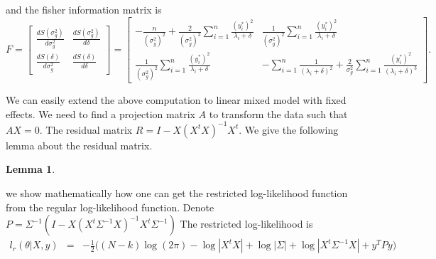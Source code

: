 \documentclass[12pt]{article}
\newtheorem{lemma}[theorem]{Lemma}
\numberwithin{equation}{section}
\begin{document}
and the fisher information matrix is
\[
F=\begin{bmatrix}
\frac{dS(\sigma_g^2)}{d \sigma_g^2} & \frac{dS(\sigma_g^2)}{d \delta} \\ \frac{dS(\delta)}{d \sigma_g^2 } &\frac{dS(\delta)}{d \delta} 
\end{bmatrix} =
\begin{bmatrix}
-\frac{n}{(\sigma_g^2)^2}+\frac{2}{(\sigma_g^2)^3} \sum_{i=1}^n \frac{(y_i^*)^2}{\lambda_i+\delta} & \frac{1}{(\sigma_g^2)^2} \sum_{i=1}^n \frac{(y_i^*)^2}{\lambda_i+\delta}  \\
\frac{1}{(\sigma_g^2)^2} \sum_{i=1}^n \frac{(y_i^*)^2}{\lambda_i+\delta}  & -\sum_{i=1}^n \frac{1}{(\lambda_i+\delta)^2}+\frac{2}{\sigma_g^2}\sum_{i=1}^n \frac{(y_i^*)^2}{(\lambda_i+\delta)^3}
\end{bmatrix}.
\]


We can easily extend the above computation to linear mixed model with fixed effects. We need to find a projection matrix $A$ to transform the data such that $AX=0$. The residual matrix $R=I-X(X^tX)^{-1}X^t$. We give the following lemma about the residual matrix.
\begin{lemma}
\end{lemma}

  we show mathematically how one can get the restricted log-likelihood function from the regular log-likelihood function. Denote $P=\Sigma^{-1}(I-X(X^t\Sigma^{-1}X)^{-1}X^t\Sigma^{-1})$ The restricted log-likelihood is
\begin{equation}
\label{eq:rllm}
\begin{array}{lcl}
l_r(\theta|X,y)&=& -\frac{1}{2}\big( (N-k)\log(2\pi)-\log|X^tX| +\log |\Sigma|+\log |X^t\Sigma^{-1} X| +y^TPy \big)\\
\end{array}
\end{equation}



\end{document}
